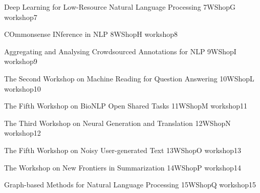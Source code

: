 \begin{wsschedule}
 {Deep Learning for Low-Resource Natural Language Processing}
 {7}{WShopG}
 {workshop7}
 {\WShopLocG}
 
\end{wsschedule}

\begin{wsschedule}
 {COmmonsense INference in NLP}
 {8}{WShopH}
 {workshop8}
 {\WShopLocH}
 
\end{wsschedule}

\begin{wsschedule}
 {Aggregating and Analysing Crowdsourced Annotations for NLP}
 {9}{WShopI}
 {workshop9}
 {\WShopLocI}
 
\end{wsschedule}

\clearpage
{}

\begin{wsschedule}
 {The Second Workshop on Machine Reading for Question Answering}
 {10}{WShopL}
 {workshop10}
 {\WShopLocL}
 
\end{wsschedule}
 
\begin{wsschedule}
 {The Fifth Workshop on BioNLP Open Shared Tasks}
 {11}{WShopM}
 {workshop11}
 {\WShopLocM}
 
\end{wsschedule}

\begin{wsschedule}
 {The Third Workshop on Neural Generation and Translation}
 {12}{WShopN}
 {workshop12}
 {\WShopLocN}
 
\end{wsschedule}

\begin{wsschedule}
 {The Fifth Workshop on Noisy User-generated Text}
 {13}{WShopO}
 {workshop13}
 {\WShopLocO}
 
\end{wsschedule}

\begin{wsschedule}
 {The Workshop on New Frontiers in Summarization}
 {14}{WShopP}
 {workshop14}
 {\WShopLocP}
 
\end{wsschedule}

\begin{wsschedule}
 {Graph-based Methods for Natural Language Processing}
 {15}{WShopQ}
 {workshop15}
 {\WShopLocQ}
 
\end{wsschedule}

